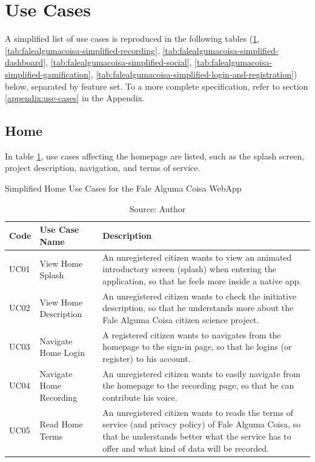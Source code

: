 \clearpage
\section{Use Cases}
\label{sec:simplified-use-cases}

A simplified list of use cases is reproduced in the following tables (\ref{tab:falealgumacoisa-simplified-home}, \ref{tab:falealgumacoisa-simplified-recording}, \ref{tab:falealgumacoisa-simplified-dashboard}, \ref{tab:falealgumacoisa-simplified-social}, \ref{tab:falealgumacoisa-simplified-gamification}, \ref{tab:falealgumacoisa-simplified-login-and-registration}) below, separated by feature set. To a more complete specification, refer to section \ref{appendix:use-cases} in the Appendix.

\subsection{Home}

In table \ref{tab:falealgumacoisa-simplified-home}, use cases affecting the homepage are listed, such as the splash screen, project description, navigation, and terms of service.

\begin{table}[h]
\caption{Simplified Home Use Cases for the Fale Alguma Coisa WebApp}
\label{tab:falealgumacoisa-simplified-home}
\centering
\begin{tabular}{|p{1cm}|p{3cm}|p{10cm}|}
\hline
    Code & Use Case Name & Description \\ \hline
    UC01 & View Home Splash & An unregistered citizen wants to view an animated introductory screen (splash) when entering the application, so that he feels more inside a native app. \\ \hline
    UC02 & View Home Description & An unregistered citizen wants to check the initiative description, so that he understands more about the Fale Alguma Coisa citizen science project. \\ \hline
    UC03 & Navigate Home Login & A registered citizen wants to navigates from the homepage to the sign-in page, so that he logins (or register) to his account. \\ \hline
    UC04 & Navigate Home Recording & An unregistered citizen wants to easily navigate from the homepage to the recording page, so that he can contribute his voice. \\ \hline
    UC05 & Read Home Terms & An unregistered citizen wants to reads the terms of service (and privacy policy) of Fale Alguma Coisa, so that he understands better what the service has to offer and what kind of data will be recorded. \\ \hline
\end{tabular}
\caption*{Source: Author}
\end{table}

